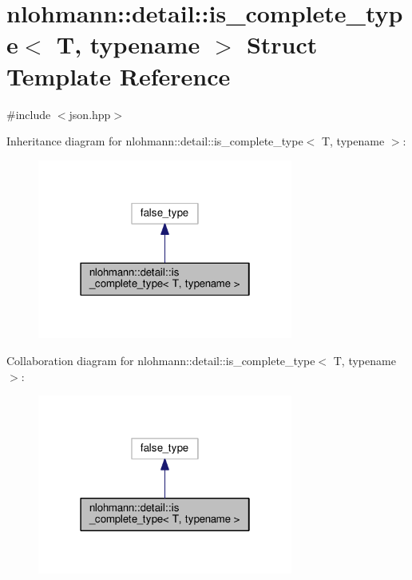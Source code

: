 \hypertarget{structnlohmann_1_1detail_1_1is__complete__type}{}\section{nlohmann\+:\+:detail\+:\+:is\+\_\+complete\+\_\+type$<$ T, typename $>$ Struct Template Reference}
\label{structnlohmann_1_1detail_1_1is__complete__type}


{\ttfamily \#include $<$json.\+hpp$>$}



Inheritance diagram for nlohmann\+:\+:detail\+:\+:is\+\_\+complete\+\_\+type$<$ T, typename $>$\+:\nopagebreak
\begin{figure}[H]
\begin{center}
\leavevmode
\includegraphics[width=238pt]{structnlohmann_1_1detail_1_1is__complete__type__inherit__graph}
\end{center}
\end{figure}


Collaboration diagram for nlohmann\+:\+:detail\+:\+:is\+\_\+complete\+\_\+type$<$ T, typename $>$\+:\nopagebreak
\begin{figure}[H]
\begin{center}
\leavevmode
\includegraphics[width=238pt]{structnlohmann_1_1detail_1_1is__complete__type__coll__graph}
\end{center}
\end{figure}


